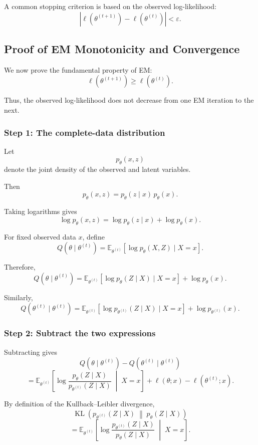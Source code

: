 A common stopping criterion is based on the observed log-likelihood:
\[
\left|
\ell(\theta^{(t+1)})
-
\ell(\theta^{(t)})
\right|
<
\varepsilon.
\]

\subsection{Proof of EM Monotonicity and Convergence}

We now prove the fundamental property of EM:
\[
\boxed{
\ell(\theta^{(t+1)})
\geq
\ell(\theta^{(t)})
}.
\]

Thus, the observed log-likelihood does not decrease from one EM
iteration to the next.

\subsubsection*{Step 1: The complete-data distribution}

Let
\[
p_\theta(x,z)
\]
denote the joint density of the observed and latent variables.

Then
\[
p_\theta(x,z)
=
p_\theta(z\mid x)\,p_\theta(x).
\]

Taking logarithms gives
\[
\log p_\theta(x,z)
=
\log p_\theta(z\mid x)
+
\log p_\theta(x).
\]

For fixed observed data $x$, define
\[
Q(\theta\mid\theta^{(t)})
=
\mathbb E_{\theta^{(t)}}
\left[
\log p_\theta(X,Z)
\mid X=x
\right].
\]

Therefore,
\[
Q(\theta\mid\theta^{(t)})
=
\mathbb E_{\theta^{(t)}}
\left[
\log p_\theta(Z\mid X)
\mid X=x
\right]
+
\log p_\theta(x).
\]

Similarly,
\[
Q(\theta^{(t)}\mid\theta^{(t)})
=
\mathbb E_{\theta^{(t)}}
\left[
\log p_{\theta^{(t)}}(Z\mid X)
\mid X=x
\right]
+
\log p_{\theta^{(t)}}(x).
\]

\subsubsection*{Step 2: Subtract the two expressions}

Subtracting gives
\[
Q(\theta\mid\theta^{(t)})
-
Q(\theta^{(t)}\mid\theta^{(t)})
\]
\[
=
\mathbb E_{\theta^{(t)}}
\left[
\log
\frac{
p_\theta(Z\mid X)
}{
p_{\theta^{(t)}}(Z\mid X)
}
\;\middle|\;
X=x
\right]
+
\ell(\theta;x)-\ell(\theta^{(t)};x).
\]

By definition of the Kullback--Leibler divergence,
\[
\operatorname{KL}
\left(
p_{\theta^{(t)}}(Z\mid X)
\;\middle\|\;
p_\theta(Z\mid X)
\right)
\]
\[
=
\mathbb E_{\theta^{(t)}}
\left[
\log
\frac{
p_{\theta^{(t)}}(Z\mid X)
}{
p_\theta(Z\mid X)
}
\;\middle|\;
X=x
\right].
\]

